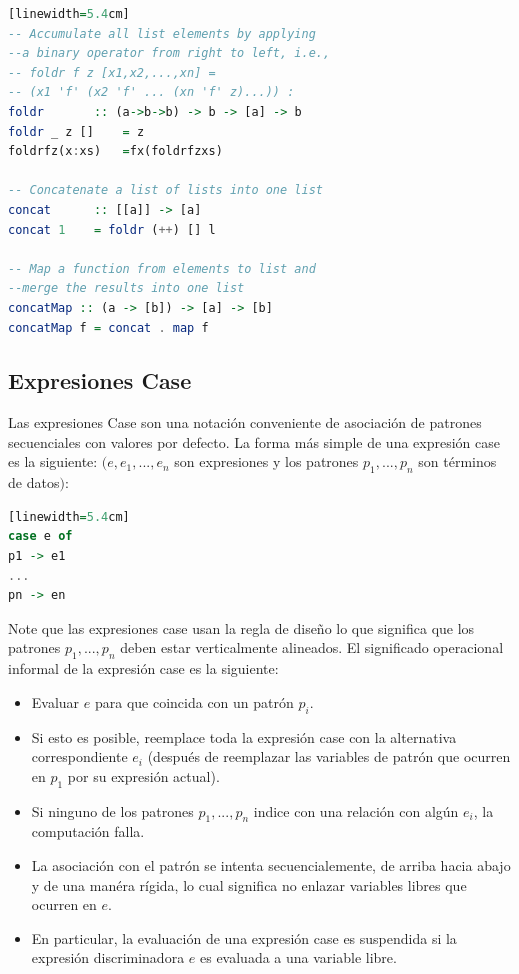 \documentclass[10pt,journal,compsoc]{IEEEtran}
\begin{document}
\begin{lstlisting}[language=Haskell, caption = {C\'odigo de ayuda para comprensi\'on del Cuadro 9.}][linewidth=5.4cm]
-- Accumulate all list elements by applying 
--a binary operator from right to left, i.e.,
-- foldr f z [x1,x2,...,xn] = 
-- (x1 'f' (x2 'f' ... (xn 'f' z)...)) :
foldr 		:: (a->b->b) -> b -> [a] -> b
foldr _ z []  	= z
foldrfz(x:xs) 	=fx(foldrfzxs)

-- Concatenate a list of lists into one list
concat 		:: [[a]] -> [a]
concat 1	= foldr (++) [] l

-- Map a function from elements to list and
--merge the results into one list
concatMap :: (a -> [b]) -> [a] -> [b]
concatMap f = concat . map f

\end{lstlisting}


\subsection{Expresiones Case}
Las expresiones Case son una notaci\'on conveniente de asociaci\'on de patrones secuenciales con valores por defecto. La forma m\'as simple de una expresi\'on case es la siguiente: $(e,e_{1},...,e_{n}$ son expresiones y los patrones $p_{1},...,p_{n}$ son t\'erminos de datos$)$: \\ 
\begin{lstlisting}[language=Haskell, caption = {Ejemplo de una expresi\'on case}][linewidth=5.4cm]
case e of 
p1 -> e1
...
pn -> en
\end{lstlisting}

Note que las expresiones case usan la regla de dise\~no lo que significa que los patrones $p_{1},...,p_{n}$ deben estar verticalmente alineados. El significado operacional informal de la expresi\'on case es la siguiente: 
\begin{itemize}
	\item Evaluar $e$ para que coincida con un patr\'on $p_{i}$.
	\item Si esto es posible, reemplace toda la expresi\'on case con la alternativa correspondiente $e_{i}$ (despu\'es de reemplazar las variables de patr\'on que ocurren en $p_{1}$ por su expresi\'on actual). 
	\item Si ninguno de los patrones $p_{1},...,p_{n}$ indice con una relaci\'on con alg\'un $e_{i}$, la computaci\'on falla.
	\item La asociaci\'on con el patr\'on se intenta secuencialemente, de arriba hacia abajo y de una man\'era r\'igida, lo cual significa no enlazar variables libres que ocurren en $e$. 
	\item En particular, la evaluaci\'on de una expresi\'on case es suspendida si la expresi\'on discriminadora $e$ es evaluada a una variable libre.
\end{itemize}
\end{document}
